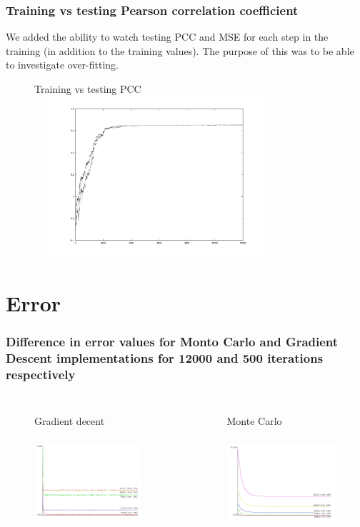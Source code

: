 \documentclass[presentation]{beamer}   %
\begin{document}
\begin{frame}
\frametitle{Training vs testing Pearson correlation coefficient}
We added the ability to watch testing PCC and MSE for each step in the training (in addition to the training values). The purpose of this was to be able to investigate over-fitting.
		\begin{figure}
		\centering Training vs testing PCC
			\includegraphics[width=90mm,height=60mm]{fig/pcc2.pdf}
		\end{figure}
\end{frame}
\section{Error}
\begin{frame}
\frametitle{Difference in error values for Monto Carlo and Gradient Descent implementations for 12000 and 500 iterations respectively}
\begin{columns}[t] %
		\begin{figure}
		\centering Gradient decent
			\includegraphics[width=40mm,height=40mm]{fig/smm_error.png}
		\end{figure}
		\begin{figure}
			\centering Monte Carlo
			\includegraphics[width=40mm,height=40mm]{fig/smm_mc_error.png}
		\end{figure}
  \end{columns}
\end{frame}
\end{document}
